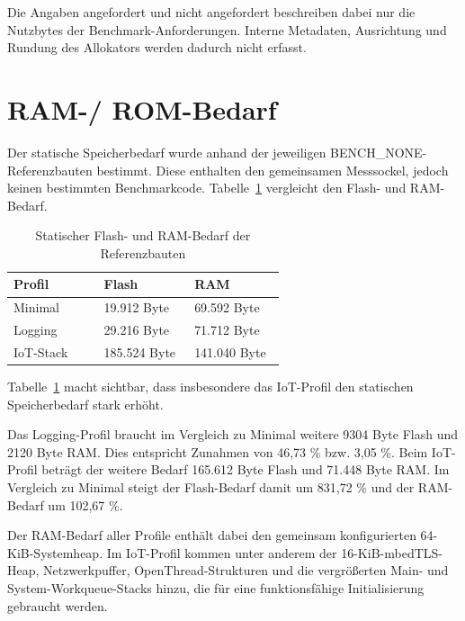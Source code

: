 Die Angaben \glqq{}angefordert\grqq{} und \glqq{}nicht angefordert\grqq{} beschreiben dabei nur die Nutzbytes der Benchmark-Anforderungen. Interne Metadaten, Ausrichtung und Rundung des Allokators werden dadurch nicht erfasst.

\section{RAM-/ ROM-Bedarf}
Der statische Speicherbedarf wurde anhand der jeweiligen BENCH\_NONE-Referenzbauten bestimmt. Diese enthalten den gemeinsamen Messsockel, jedoch keinen bestimmten Benchmarkcode. Tabelle~\ref{tab:speicherbedarf-referenzbauten} vergleicht den Flash- und RAM-Bedarf.

\begin{longtable}{p{0.313\linewidth}p{0.313\linewidth}p{0.313\linewidth}}
\caption{Statischer Flash- und RAM-Bedarf der Referenzbauten}\label{tab:speicherbedarf-referenzbauten}\\
\toprule
Profil & Flash & RAM \\
\midrule
Minimal & 19.912 Byte & 69.592 Byte \\
Logging & 29.216 Byte & 71.712 Byte \\
IoT-Stack & 185.524 Byte & 141.040 Byte \\
\bottomrule
\end{longtable}

Tabelle~\ref{tab:speicherbedarf-referenzbauten} macht sichtbar, dass insbesondere das IoT-Profil den statischen Speicherbedarf stark erh{\"o}ht.

Das Logging-Profil braucht im Vergleich zu Minimal weitere 9304 Byte Flash und 2120 Byte RAM. Dies entspricht Zunahmen von 46,73 \% bzw. 3,05 \%. Beim IoT-Profil betr{\"a}gt der weitere Bedarf 165.612 Byte Flash und 71.448 Byte RAM. Im Vergleich zu Minimal steigt der Flash-Bedarf damit um 831,72 \% und der RAM-Bedarf um 102,67 \%.

Der RAM-Bedarf aller Profile enth{\"a}lt dabei den gemeinsam konfigurierten 64-KiB-Systemheap. Im IoT-Profil kommen unter anderem der 16-KiB-mbedTLS-Heap, Netzwerkpuffer, OpenThread-Strukturen und die vergr{\"o}{\ss}erten Main- und System-Workqueue-Stacks hinzu, die f{\"u}r eine funktionsf{\"a}hige Initialisierung gebraucht werden.
